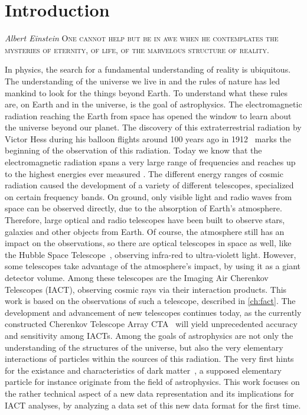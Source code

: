 \chapter{Introduction}
\nocite{biblatex, siunitx, Hunter:2007}%
%
\begin{aquote}{\textit{Albert Einstein}}
\textsc{One cannot help but be in awe when he contemplates the mysteries of eternity, of life, of the marvelous structure of reality.}
\end{aquote}
In physics, the search for a fundamental understanding of reality is ubiquitous. The understanding of the universe we live in and the rules of nature has
led mankind to look for the things beyond Earth. To understand what these rules
are, on Earth and in the universe, is the goal of astrophysics. The electromagnetic radiation reaching the Earth from space has opened the window to learn
about the universe beyond our planet. The discovery of this extraterrestrial
radiation by Victor Hess during his balloon flights around \num{100} years ago in \num{1912}~\cite{Hess} marks the beginning of the observation of this radiation.
Today we know that the electromagnetic radiation spans a very large range of
frequencies and reaches up to the highest energies ever measured \cite{aharonian}.
The different energy ranges of cosmic radiation caused the development of a
variety of different telescopes, specialized on certain frequency bands. On
ground, only visible light and radio waves from space can be observed directly,
due to the absorption of Earth's atmosphere. Therefore, large optical and radio
telescopes have been built to observe stars, galaxies and other objects from
Earth. Of course, the atmosphere still has an impact on the observations, so
there are optical telescopes in space as well, like the Hubble Space
Telescope~\cite{hubble}, observing infra-red to ultra-violett light. However,
some telescopes take advantage of the atmosphere's impact, by using it as a
giant detector volume. Among these telescopes are the Imaging Air Cherenkov
Telescopes (IACT), observing cosmic rays via their interaction products. This
work is based on the observations of such a telescope, described in
\autoref{ch:fact}. The development and advancement of new telescopes continues
today, as the currently constructed Cherenkov Telescope Array CTA~\cite{cta}
will yield unprecedented accuracy and sensitivity among IACTs.
Among the goals of astrophysics are not only the understanding of the
structures of the universe, but also the very elementary interactions of
particles within the sources of this radiation. The very first hints for the
existance and characteristics of dark matter~\cite{zwicky}, a supposed
elementary particle for instance originate from the field of astrophysics.
This work focuses on the rather technical aspect of a new data representation
and its implications for IACT analyses, by analyzing a data set of this new data
format for the first time.
